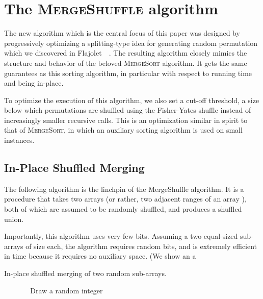 \documentclass[letter,11pt,en]{quick-document}
\def\OneLineIf#1#2{\State\algorithmicif\ #1\ \algorithmicthen\ #2}
\begin{document}
\section{The \textsc{MergeShuffle} algorithm}

The new algorithm which is the central focus of this paper was designed by
progressively optimizing a splitting-type idea for generating random
permutation which we discovered in Flajolet~\etal~\cite{FlPeSo11}. The
resulting algorithm closely mimics the structure and behavior of the
beloved \textsc{MergeSort} algorithm. It gets the same guarantees as this
sorting algorithm, in particular with respect to running time and being in-place.

To optimize the execution of this algorithm, we also set a cut-off
threshold, a size below which permutations are shuffled using the
Fisher-Yates shuffle instead of increasingly smaller recursive calls. This
is an optimization similar in spirit to that of \textsc{MergeSort}, in
which an auxiliary sorting algorithm is used on small instances.

\subsection{In-Place Shuffled Merging}

The following algorithm is the linchpin of the MergeShuffle algorithm. It
is a procedure that takes two arrays (or rather, two adjacent ranges of an
array ), both of which are assumed to be randomly shuffled, and
produces a shuffled union.

Importantly, this algorithm uses very few bits. Assuming a two equal-sized
sub-arrays of size  each, the algorithm requires
 random bits, and is extremely efficient in
time because it requires no auxiliary space. (We show an a

\begin{algorithm}
\caption{In-place shuffled merging of two random sub-arrays.}
\label{alg-flip-merge}
\begin{algorithmic}[1]
\State 
{}
\State 
\State 
\Loop

    \OneLineIf{}{\Break}
  \Else
    \OneLineIf{}{\Break}
    \State {}
    \State 
  \EndIf
  \State 
\EndLoop
\While{}
  \State Draw a random integer 
  \State {}
  \State 
\EndWhile
\EndProcedure
\end{algorithmic}
\end{algorithm}
\end{document}
